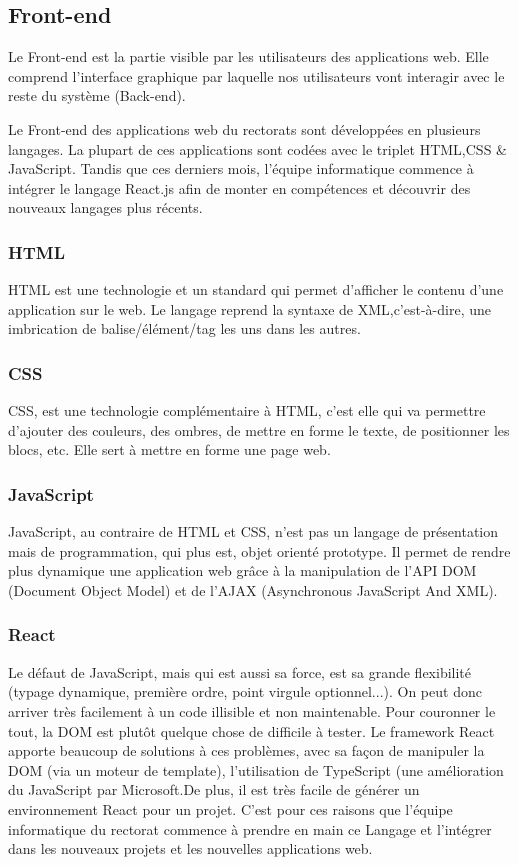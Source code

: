 \documentclass[a4paper]{article}
\begin{document}
\subsection{Front-end}
Le Front-end est la partie visible par les utilisateurs des applications web. Elle comprend l'interface graphique par laquelle nos utilisateurs vont interagir avec 
le reste du système (Back-end).


Le Front-end des applications web du rectorats sont développées en plusieurs langages. La plupart de ces applications  sont codées avec le triplet HTML,CSS \& JavaScript. Tandis que ces derniers mois, l'équipe informatique commence à intégrer le langage React.js  afin de monter en compétences et découvrir des nouveaux langages plus récents. 

\subsubsection{HTML}

HTML est une technologie et un standard qui permet d'afficher le contenu d'une application sur le web. Le langage reprend la syntaxe de XML,c'est-à-dire, une imbrication de balise/élément/tag les uns dans les autres.

\subsubsection{CSS}

CSS, est une technologie complémentaire à HTML, c'est elle qui va permettre d'ajouter des couleurs, des ombres, de mettre en forme le texte, de positionner les blocs, etc. Elle sert à mettre en forme une page web. 

\subsubsection{JavaScript}

JavaScript, au contraire de HTML et CSS, n'est pas un langage de présentation mais de programmation, qui plus est, objet orienté prototype. Il permet de rendre plus dynamique une application web grâce à la manipulation de l'API DOM (Document Object Model) et de l'AJAX (Asynchronous JavaScript And XML).

\subsubsection{React}

Le défaut de JavaScript, mais qui est aussi sa force, est sa grande flexibilité (typage dynamique, première ordre, point virgule optionnel...). On peut donc arriver très facilement à un code illisible et non maintenable. Pour couronner le tout, la DOM est
plutôt quelque chose de difficile à tester. Le framework React apporte beaucoup de solutions à ces problèmes, avec sa façon de manipuler la DOM (via un moteur de template), l'utilisation de TypeScript (une amélioration du JavaScript par Microsoft.De plus, il est très facile de générer un environnement React pour
un projet. C'est pour ces raisons que l'équipe informatique du rectorat commence à prendre en main ce Langage et l’intégrer dans les nouveaux projets et les nouvelles applications web. 
\end{document}
